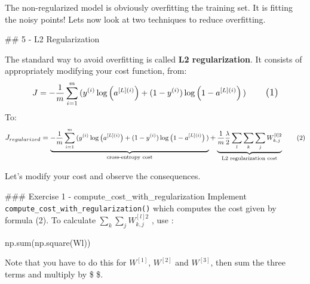 \documentclass[11pt]{article}
\newenvironment{Shaded}{}{}
\newcommand{\NormalTok}[1]{{#1}}
\newcommand{\BuiltInTok}[1]{{#1}}
\begin{document}
    The non-regularized model is obviously overfitting the training set. It
is fitting the noisy points! Lets now look at two techniques to reduce
overfitting.

    \#\# 5 - L2 Regularization

The standard way to avoid overfitting is called \textbf{L2
regularization}. It consists of appropriately modifying your cost
function, from:
\[J = -\frac{1}{m} \sum\limits_{i = 1}^{m} \large{(}\small  y^{(i)}\log\left(a^{[L](i)}\right) + (1-y^{(i)})\log\left(1- a^{[L](i)}\right) \large{)} \tag{1}\]
To:
\[J_{regularized} = \small \underbrace{-\frac{1}{m} \sum\limits_{i = 1}^{m} \large{(}\small y^{(i)}\log\left(a^{[L](i)}\right) + (1-y^{(i)})\log\left(1- a^{[L](i)}\right) \large{)} }_\text{cross-entropy cost} + \underbrace{\frac{1}{m} \frac{\lambda}{2} \sum\limits_l\sum\limits_k\sum\limits_j W_{k,j}^{[l]2} }_\text{L2 regularization cost} \tag{2}\]

Let's modify your cost and observe the consequences.

\#\#\# Exercise 1 - compute\_cost\_with\_regularization Implement
\texttt{compute\_cost\_with\_regularization()} which computes the cost
given by formula (2). To calculate
\(\sum\limits_k\sum\limits_j W_{k,j}^{[l]2}\) , use :

\begin{Shaded}
\begin{Highlighting}[]
\NormalTok{np.}\BuiltInTok{sum}\NormalTok{(np.square(Wl))}
\end{Highlighting}
\end{Shaded}

Note that you have to do this for \(W^{[1]}\), \(W^{[2]}\) and
\(W^{[3]}\), then sum the three terms and multiply by \$ 
 \$.
\end{document}
